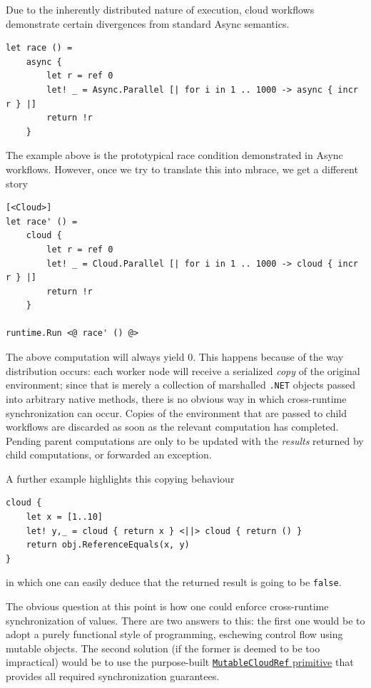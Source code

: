 \documentclass[9pt,a4paper]{article}
\newcommand{\mbrace}{mbrace}
\newcommand{\dotnet}{\texttt{\hbox{.}NET}}
\begin{document}
Due to the inherently distributed nature of execution, cloud workflows demonstrate
certain divergences from standard Async semantics.
\begin{lstlisting}
let race () =
    async {
        let r = ref 0
        let! _ = Async.Parallel [| for i in 1 .. 1000 -> async { incr r } |]
        return !r
    }
\end{lstlisting}
The example above is the prototypical race condition demonstrated in Async workflows.
However, once we try to translate this into \mbrace, we get a different story
\begin{lstlisting}
[<Cloud>]
let race' () =
    cloud {
        let r = ref 0
        let! _ = Cloud.Parallel [| for i in 1 .. 1000 -> cloud { incr r } |]
        return !r
    }

runtime.Run <@ race' () @>
\end{lstlisting}
The above computation will always yield 0. This happens because of the way distribution
occurs: each worker node will receive a serialized \emph{copy} of the original environment;
since that is merely a collection of marshalled \dotnet{} objects passed into arbitrary
native methods, there is no obvious way in which cross-runtime synchronization can occur.
Copies of the environment that are passed to child workflows are discarded as soon as the
relevant computation has completed. Pending parent computations are only to be updated with
the \emph{results} returned by child computations, or forwarded an exception.

A further example highlights this copying behaviour
\begin{lstlisting}
cloud {
    let x = [1..10]
    let! y,_ = cloud { return x } <||> cloud { return () }
    return obj.ReferenceEquals(x, y)
}
\end{lstlisting}
in which one can easily deduce that the returned result is going to be \texttt{false}.

The obvious question at this point is how one could enforce cross-runtime
synchronization of values. There are two answers to this: the first one would be
to adopt a purely functional style of programming, eschewing control flow using mutable
objects. The second solution (if the former is deemed to be too impractical) would be
to use the purpose-built \hyperref[mutableCloudRef]{\texttt{MutableCloudRef} primitive} that 
provides all required synchronization guarantees.
\end{document}
